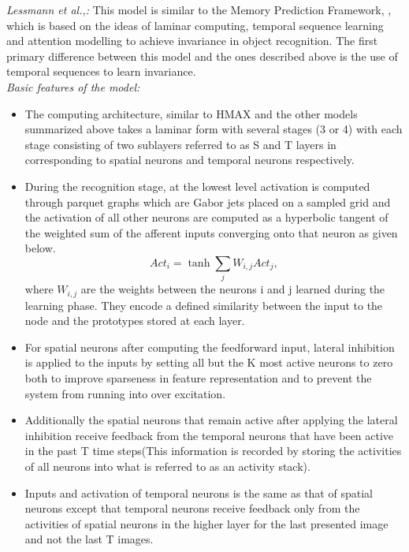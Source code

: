 \documentclass[12pt,twoside]{article}
\theoremstyle{plain}
\theoremstyle{definition}
\theoremstyle{remark}
\begin{document}
\textit{Lessmann et al.,: } This model is similar to the Memory Prediction Framework\cite{Hawkins2004}, \cite{DileepGeorge2009}, \cite{George2008} which is based on the ideas of laminar computing, temporal sequence learning and attention modelling to achieve invariance in object recognition. The first primary difference between this model and the ones described above is the use of temporal sequences to learn invariance.\\

\textit{Basic features of the model: } 
\begin{itemize}
\item The computing architecture, similar to HMAX\cite{MaximilianRiesenhuber1999} and the other models summarized above takes a laminar form with several stages (3 or 4) with each stage consisting of two sublayers referred to as S and T layers in \cite{MarkusLessmann2014} corresponding to spatial neurons and temporal neurons respectively.
\item During the recognition stage, at the lowest level activation is computed through parquet graphs\cite{westphal-feat} which are Gabor jets\cite{Gabor1946} placed on a sampled grid  and the activation of all other neurons are computed as a hyperbolic tangent of the weighted sum of the afferent inputs converging onto that neuron\cite{MarkusLessmann2014} as given below. \begin{equation}
Act_i = \tanh\sum\limits_jW_{i,j}Act_j, 
\end{equation} 
where  $W_{i,j}$ are the weights between the neurons i and j learned during the learning phase. They encode a defined similarity between the input to the node and the prototypes stored at each layer.
\item For spatial neurons after computing the feedforward input, lateral inhibition is applied to the inputs by setting all but the K most active neurons to zero both to improve sparseness in feature representation and to prevent the system from running into over excitation.
\item Additionally the spatial neurons that remain active after applying the lateral inhibition receive feedback from the temporal neurons that have been active in the past T time steps(This information is recorded by storing the activities of all neurons into what is referred to as an activity stack\cite{MarkusLessmann2014}).
\item Inputs and activation of temporal neurons is the same as that of spatial neurons except that temporal neurons receive feedback only from the activities of spatial neurons in the higher layer for the last presented image and not the last T images. 

\end{itemize}
\end{document}
